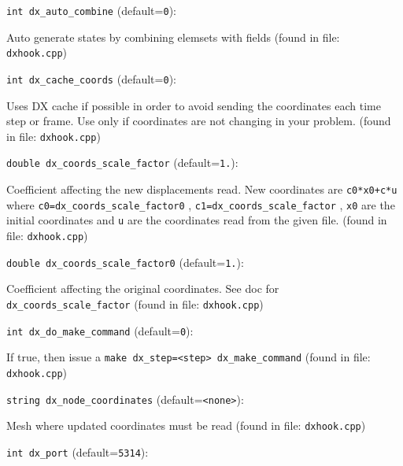 \item\verb+int dx_auto_combine+ {\rm(default=\verb|0|)}:

Auto generate states by combining elemsets with fields
 (found in file: \verb+dxhook.cpp+)
\item\verb+int dx_cache_coords+ {\rm(default=\verb|0|)}:

Uses DX cache if possible in order to avoid sending the coordinates
 each time step or frame. Use only if coordinates are not changing
 in your problem. 
 (found in file: \verb+dxhook.cpp+)
\item\verb+double dx_coords_scale_factor+ {\rm(default=\verb|1.|)}:

Coefficient affecting the new displacements read. 
 New coordinates are {\tt c0*x0+c*u} where
 \verb+c0=dx_coords_scale_factor0+ ,  \verb+c1=dx_coords_scale_factor+ ,
 \verb+x0+  are the initial coordinates and  \verb+u+  are the coordinates read
 from the given file. 
 (found in file: \verb+dxhook.cpp+)
\item\verb+double dx_coords_scale_factor0+ {\rm(default=\verb|1.|)}:

Coefficient affecting the original coordinates. See doc for
 \verb+dx_coords_scale_factor+ 
 (found in file: \verb+dxhook.cpp+)
\item\verb+int dx_do_make_command+ {\rm(default=\verb|0|)}:

If true, then issue a \verb+make dx_step=<step> dx_make_command+
 (found in file: \verb+dxhook.cpp+)
\item\verb+string dx_node_coordinates+ {\rm(default=\verb|<none>|)}:

Mesh where updated coordinates must be read
 (found in file: \verb+dxhook.cpp+)
\item\verb+int dx_port+ {\rm(default=\verb|5314|)}:

